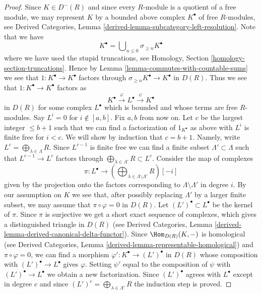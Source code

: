 \begin{proof}
\medskip\noindent
Since $K \in D^{-}(R)$ and since every $R$-module is a quotient of a free
module, we may represent $K$ by a bounded above complex $K^\bullet$
of free $R$-modules, see
Derived Categories, Lemma \ref{derived-lemma-subcategory-left-resolution}.
Note that we have
$$
K^\bullet = \bigcup\nolimits_{n \leq 0} \sigma_{\geq n}K^\bullet
$$
where we have used the stupid truncations, see
Homology, Section \ref{homology-section-truncations}.
Hence by Lemma \ref{lemma-commutes-with-countable-sums} we see that
$1 : K^\bullet \to K^\bullet$ factors through
$\sigma_{\geq n}K^\bullet \to K^\bullet$ in $D(R)$.
Thus we see that $1 : K^\bullet \to K^\bullet$ factors as
$$
K^\bullet \xrightarrow{\varphi} L^\bullet \xrightarrow{\psi} K^\bullet
$$
in $D(R)$ for some complex $L^\bullet$ which is bounded and whose terms
are free $R$-modules. Say $L^i = 0$ for $i \not \in [a, b]$.
Fix $a, b$ from now on. Let $c$ be the largest integer $\leq b + 1$
such that we can find a factorization of $1_{K^\bullet}$ as above
with $L^i$ is finite free for $i < c$. We will show by induction that
$c = b + 1$. Namely, write $L^c = \bigoplus_{\lambda \in \Lambda} R$.
Since $L^{c - 1}$ is finite free we can find a finite subset
$\Lambda' \subset \Lambda$ such that $L^{c - 1} \to L^c$ factors
through $\bigoplus_{\lambda \in \Lambda'} R \subset L^c$. Consider the
map of complexes
$$
\pi :
L^\bullet
\longrightarrow
(\bigoplus\nolimits_{\lambda \in \Lambda \setminus \Lambda'} R)[-i]
$$
given by the projection onto the factors corresponding to
$\Lambda \setminus \Lambda'$ in degree $i$.
By our assumption on $K$ we see that, after possibly replacing $\Lambda'$ by
a larger finite subset, we may assume that $\pi \circ \varphi = 0$
in $D(R)$. Let $(L')^\bullet \subset L^\bullet$ be the kernel of $\pi$.
Since $\pi$ is surjective we get a short exact sequence of complexes,
which gives a distinguished triangle in $D(R)$ (see
Derived Categories, Lemma \ref{derived-lemma-derived-canonical-delta-functor}).
Since $\Hom_{D(R)}(K, -)$ is homological (see
Derived Categories, Lemma \ref{derived-lemma-representable-homological})
and $\pi \circ \varphi = 0$, we can find a morphism
$\varphi' : K^\bullet \to (L')^\bullet$ in $D(R)$ whose
composition with $(L')^\bullet \to L^\bullet$ gives $\varphi$.
Setting $\psi'$ equal to the composition of $\psi$ with
$(L')^\bullet \to L^\bullet$ we obtain a new factorization.
Since $(L')^\bullet$ agrees with $L^\bullet$ except in degree $c$
and since $(L')^c = \bigoplus_{\lambda \in \Lambda'} R$ the
induction step is proved.


\end{proof}
